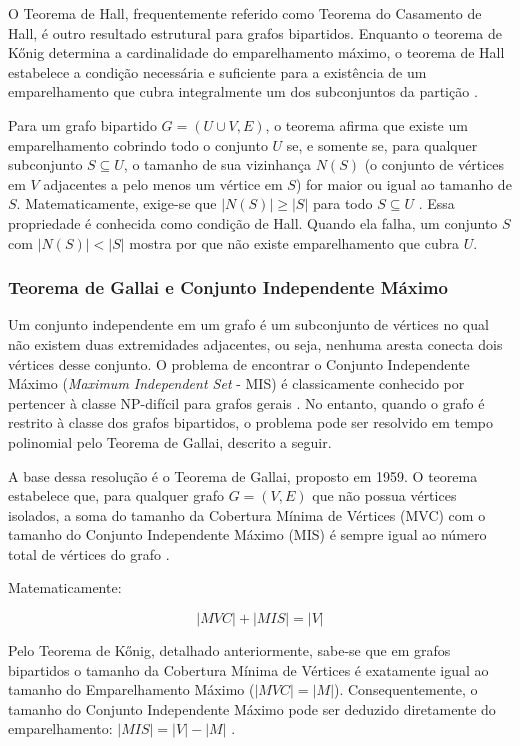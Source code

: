 O Teorema de Hall, frequentemente referido como Teorema do Casamento de Hall, é outro resultado estrutural para grafos bipartidos. Enquanto o teorema de Kőnig determina a cardinalidade do emparelhamento máximo, o teorema de Hall estabelece a condição necessária e suficiente para a existência de um emparelhamento que cubra integralmente um dos subconjuntos da partição \cite{schrijver}. 

Para um grafo bipartido $G=(U \cup V, E)$, o teorema afirma que existe um emparelhamento cobrindo todo o conjunto $U$ se, e somente se, para qualquer subconjunto $S \subseteq U$, o tamanho de sua vizinhança $N(S)$ (o conjunto de vértices em $V$ adjacentes a pelo menos um vértice em $S$) for maior ou igual ao tamanho de $S$. Matematicamente, exige-se que $|N(S)| \ge |S|$ para todo $S \subseteq U$ \cite{jungnickel}.  Essa propriedade é conhecida como condição de Hall. Quando ela falha, um conjunto $S$ com $|N(S)| < |S|$ mostra por que não existe emparelhamento que cubra $U$.

\subsubsection{Teorema de Gallai e Conjunto Independente Máximo}

Um conjunto independente em um grafo é um subconjunto de vértices no qual não existem duas extremidades adjacentes, ou seja, nenhuma aresta conecta dois vértices desse conjunto. O problema de encontrar o Conjunto Independente Máximo (\textit{Maximum Independent Set} - MIS) é classicamente conhecido por pertencer à classe NP-difícil para grafos gerais \cite{garey-jhonson}. No entanto, quando o grafo é restrito à classe dos grafos bipartidos, o problema pode ser resolvido em tempo polinomial pelo Teorema de Gallai, descrito a seguir.

A base dessa resolução é o Teorema de Gallai, proposto em 1959. O teorema estabelece que, para qualquer grafo $G=(V, E)$ que não possua vértices isolados, a soma do tamanho da Cobertura Mínima de Vértices (MVC) com o tamanho do Conjunto Independente Máximo (MIS) é sempre igual ao número total de vértices do grafo \cite{schrijver}. 

Matematicamente:

\begin{equation}
    |MVC| + |MIS| = |V|
\end{equation}

Pelo Teorema de Kőnig, detalhado anteriormente, sabe-se que em grafos bipartidos o tamanho da Cobertura Mínima de Vértices é exatamente igual ao tamanho do Emparelhamento Máximo ($|MVC| = |M|$). Consequentemente, o tamanho do Conjunto Independente Máximo pode ser deduzido diretamente do emparelhamento: $|MIS| = |V| - |M|$ \cite{jungnickel}.

